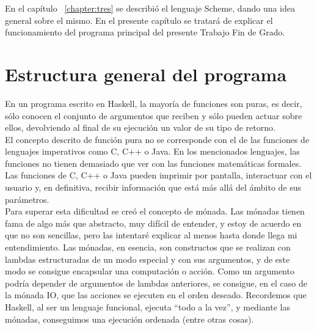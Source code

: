 

En el cap\'itulo ~\ref{chapter:tres} se describi\'o el lenguaje Scheme, dando una idea general sobre el mismo. En el presente cap\'itulo se tratar\'a de explicar el funcionamiento del programa principal del presente Trabajo Fin de Grado.

\section{Estructura general del programa}
\label{3:sec1}

En un programa escrito en Haskell, la mayor\'ia de funciones son puras, es decir, s\'olo conocen el conjunto de argumentos que reciben y s\'olo pueden actuar sobre ellos, devolviendo al final de su ejecuci\'on un valor de su tipo de retorno.\\

El concepto descrito de funci\'on pura no se corresponde con el de las funciones de lenguajes imperativos como C, C++ o Java. En los mencionados lenguajes, las funciones no tienen demasiado que ver con las funciones matem\'aticas formales. Las funciones de C, C++ o Java pueden imprimir por pantalla, interactuar con el usuario y, en definitiva, recibir informaci\'on que est\'a m\'as all\'a del \'ambito de sus par\'ametros.\\

Para superar esta dificultad se cre\'o el concepto de m\'onada. Las m\'onadas tienen fama de algo m\'as que abstracto, muy dif\'icil de entender, y estoy de acuerdo en que no son sencillas, pero las intentar\'e explicar al menos hasta donde llega mi entendimiento. Las m\'onadas, en esencia, son constructos que se realizan con lambdas estructuradas de un modo especial y con sus argumentos, y de este modo se consigue encapsular una computaci\'on o acci\'on. Como un argumento podr\'ia depender de argumentos de lambdas anteriores, se consigue, en el caso de la m\'onada IO, que las acciones se ejecuten en el orden deseado. Recordemos que Haskell, al ser un lenguaje funcional, ejecuta ``todo a la vez'', y mediante las m\'onadas, conseguimos una ejecuci\'on ordenada (entre otras cosas).\\

